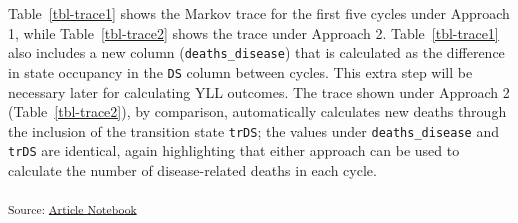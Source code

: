 \documentclass[
]{agujournal2019}
\begin{document}
Table~\ref{tbl-trace1} shows the Markov trace for the first five cycles
under Approach 1, while Table~\ref{tbl-trace2} shows the trace under
Approach 2. Table~\ref{tbl-trace1} also includes a new column
(\texttt{deaths\_disease}) that is calculated as the difference in state
occupancy in the \texttt{DS} column between cycles. This extra step will
be necessary later for calculating YLL outcomes. The trace shown under
Approach 2 (Table~\ref{tbl-trace2}), by comparison, automatically
calculates new deaths through the inclusion of the transition state
\texttt{trDS}; the values under \texttt{deaths\_disease} and
\texttt{trDS} are identical, again highlighting that either approach can
be used to calculate the number of disease-related deaths in each cycle.

\begin{table}

\caption{\label{tbl-trace1}Markov Trace Under Approach 1}


\end{table}%

\textsubscript{Source:
\href{https://graveja0.github.io/dalys/index.qmd.html}{Article
Notebook}}
\end{document}
